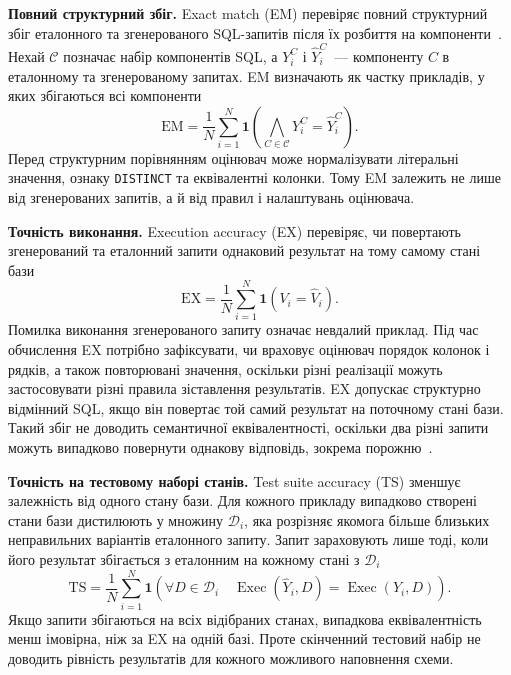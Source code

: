 \documentclass[a4paper,14pt,oneside]{extreport}
\begin{document}
\textbf{Повний структурний збіг.}
Exact match (EM) перевіряє повний структурний збіг еталонного та згенерованого SQL-запитів після їх розбиття на компоненти~\cite{yu2018spider,liu2025survey}. Нехай \(\mathcal C\) позначає набір компонентів SQL, а \(Y_i^C\) і \(\hat Y_i^C\)~--- компоненту \(C\) в еталонному та згенерованому запитах. EM визначають як частку прикладів, у яких збігаються всі компоненти
\begin{equation}
\label{eq:em}
\mathrm{EM}
=\frac{1}{N}\sum_{i=1}^{N}
\mathbf{1}\left(
\bigwedge_{C\in\mathcal C}Y_i^C=\hat Y_i^C
\right).
\end{equation}
Перед структурним порівнянням оцінювач може нормалізувати літеральні значення, ознаку \texttt{DISTINCT} та еквівалентні колонки. Тому EM залежить не лише від згенерованих запитів, а й від правил і налаштувань оцінювача.

\textbf{Точність виконання.}
Execution accuracy (EX) перевіряє, чи повертають згенерований та еталонний запити однаковий результат на тому самому стані бази~\cite{liu2025survey}
\begin{equation}
\label{eq:ex}
\mathrm{EX}
=\frac{1}{N}\sum_{i=1}^{N}
\mathbf{1}(V_i=\hat V_i).
\end{equation}
Помилка виконання згенерованого запиту означає невдалий приклад. Під час обчислення EX потрібно зафіксувати, чи враховує оцінювач порядок колонок і рядків, а також повторювані значення, оскільки різні реалізації можуть застосовувати різні правила зіставлення результатів. EX допускає структурно відмінний SQL, якщо він повертає той самий результат на поточному стані бази. Такий збіг не доводить семантичної еквівалентності, оскільки два різні запити можуть випадково повернути однакову відповідь, зокрема порожню~\cite{finegandollak2018evaluation}.

\textbf{Точність на тестовому наборі станів.}
Test suite accuracy (TS) зменшує залежність від одного стану бази. Для кожного прикладу випадково створені стани бази дистилюють у множину \(\mathcal D_i\), яка розрізняє якомога більше близьких неправильних варіантів еталонного запиту. Запит зараховують лише тоді, коли його результат збігається з еталонним на кожному стані з \(\mathcal D_i\)~\cite{zhong2020testsuites}
\begin{equation}
\label{eq:ts}
\mathrm{TS}
=\frac{1}{N}\sum_{i=1}^{N}
\mathbf{1}\left(
\forall D\in\mathcal D_i\quad
\operatorname{Exec}(\hat Y_i,D)
=\operatorname{Exec}(Y_i,D)
\right).
\end{equation}
Якщо запити збігаються на всіх відібраних станах, випадкова еквівалентність менш імовірна, ніж за EX на одній базі. Проте скінченний тестовий набір не доводить рівність результатів для кожного можливого наповнення схеми.
\end{document}
